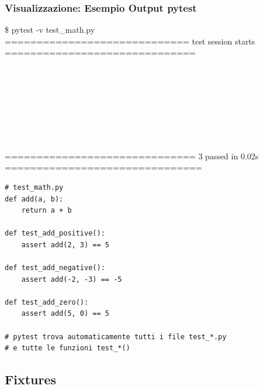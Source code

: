 \subsubsection{Visualizzazione: Esempio Output pytest}

\begin{tcolorbox}[colback=black!90, coltext=white, fontupper=\ttfamily\footnotesize, title=Terminal: pytest output]
\textcolor{green!80}{\$ pytest -v test\_math.py}\\
\textcolor{cyan!70}{============================= test session starts ==============================}\\
\textcolor{white}{platform darwin -- Python 3.11.0, pytest-7.4.0, pluggy-1.3.0}\\
\textcolor{white}{rootdir: /home/user/project}\\
\textcolor{white}{collected 3 items}\\
\\
\textcolor{white}{test\_math.py::test\_add\_positive \textcolor{green!70}{PASSED}                              [ 33\%]}\\
\textcolor{white}{test\_math.py::test\_add\_negative \textcolor{green!70}{PASSED}                              [ 66\%]}\\
\textcolor{white}{test\_math.py::test\_add\_zero \textcolor{green!70}{PASSED}                                  [100\%]}\\
\\
\textcolor{green!70}{============================== 3 passed in 0.02s ===============================}
\end{tcolorbox}

\begin{lstlisting}
# test_math.py
def add(a, b):
    return a + b

def test_add_positive():
    assert add(2, 3) == 5

def test_add_negative():
    assert add(-2, -3) == -5

def test_add_zero():
    assert add(5, 0) == 5

# pytest trova automaticamente tutti i file test_*.py
# e tutte le funzioni test_*()
\end{lstlisting}

\subsection{Fixtures}

